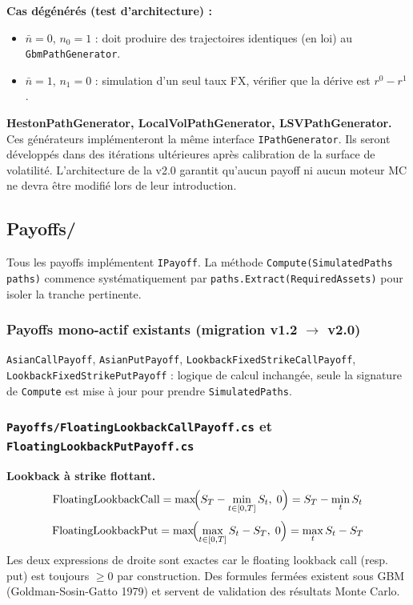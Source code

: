 \documentclass[a4paper,11pt]{article}
\newcommand{\cs}[1]{\texttt{\color{codeinline}#1}}
\begin{document}
\textbf{Cas d\'eg\'en\'er\'es (test d'architecture) :}
\begin{itemize}[leftmargin=1.5em]
  \item $\bar{n}=0$, $n_0=1$ : doit produire des trajectoires identiques (en loi) au \cs{GbmPathGenerator}.
  \item $\bar{n}=1$, $n_1=0$ : simulation d'un seul taux FX, v\'erifier que la d\'erive est $r^0 - r^1$.
\end{itemize}

\begin{tcolorbox}[todo]
\textbf{HestonPathGenerator, LocalVolPathGenerator, LSVPathGenerator.} Ces g\'en\'erateurs
impl\'ementeront la m\^eme interface \cs{IPathGenerator}. Ils seront d\'evelopp\'es dans
des it\'erations ult\'erieures apr\`es calibration de la surface de volatilit\'e. L'architecture
de la v2.0 garantit qu'aucun payoff ni aucun moteur MC ne devra \^etre modifi\'e lors
de leur introduction.
\end{tcolorbox}

\subsection{Payoffs/}

Tous les payoffs impl\'ementent \cs{IPayoff}. La m\'ethode \cs{Compute(SimulatedPaths paths)}
commence syst\'ematiquement par \cs{paths.Extract(RequiredAssets)} pour isoler la
tranche pertinente.

\subsubsection{Payoffs mono-actif existants (migration v1.2 $\to$ v2.0)}

\cs{AsianCallPayoff}, \cs{AsianPutPayoff}, \cs{LookbackFixedStrikeCallPayoff},
\cs{LookbackFixedStrikePutPayoff} : logique de calcul inchang\'ee, seule la signature
de \cs{Compute} est mise \`a jour pour prendre \cs{SimulatedPaths}.

\subsubsection{\texttt{Payoffs/FloatingLookbackCallPayoff.cs} et \texttt{FloatingLookbackPutPayoff.cs}}

\begin{tcolorbox}[math]
\textbf{Lookback \`a strike flottant.}
\[
  \text{FloatingLookbackCall} = \max\!\Bigl(S_T - \min_{t \in [0,T]} S_t,\; 0\Bigr)
  = S_T - \min_{t} S_t
\]
\[
  \text{FloatingLookbackPut} = \max\!\Bigl(\max_{t \in [0,T]} S_t - S_T,\; 0\Bigr)
  = \max_{t} S_t - S_T
\]
Les deux expressions de droite sont exactes car le floating lookback call (resp. put)
est toujours $\ge 0$ par construction. Des formules ferm\'ees existent sous GBM
(Goldman-Sosin-Gatto 1979) et servent de validation des r\'esultats Monte Carlo.
\end{tcolorbox}
\end{document}

